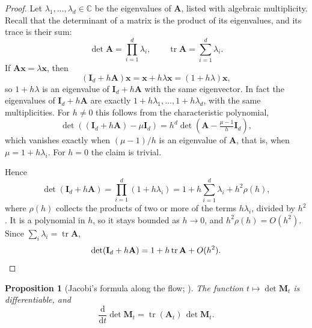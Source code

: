 \documentclass[11pt,a4paper]{article}
\numberwithin{equation}{section}     %
\theoremstyle{plain}        %
\newtheorem{proposition}[theorem]{Proposition}
\theoremstyle{definition}   %
\theoremstyle{remark}       %
\begin{document}
\begin{proof}
Let $\lambda_1,\dots,\lambda_d\in\mathbb{C}$ be the eigenvalues of $\mathbf{A}$, listed with algebraic multiplicity. Recall that the determinant of a matrix is the product of its eigenvalues, and its trace is their sum:
\[
\det\mathbf{A}=\prod_{i=1}^d\lambda_i,\qquad\operatorname{tr}\mathbf{A}=\sum_{i=1}^d\lambda_i .
\]
If $\mathbf{A}\mathbf{x}=\lambda\mathbf{x}$, then
\[
(\mathbf{I}_d+h\mathbf{A})\mathbf{x}=\mathbf{x}+h\lambda\mathbf{x}=(1+h\lambda)\mathbf{x},
\]
so $1+h\lambda$ is an eigenvalue of $\mathbf{I}_d+h\mathbf{A}$ with the same eigenvector. In fact the eigenvalues of $\mathbf{I}_d+h\mathbf{A}$ are exactly $1+h\lambda_1,\dots,1+h\lambda_d$, with the same multiplicities. For $h\neq0$ this follows from the characteristic polynomial,
\[
\det\left((\mathbf{I}_d+h\mathbf{A})-\mu\mathbf{I}_d\right)=h^d\det\left(\mathbf{A}-\tfrac{\mu-1}{h}\mathbf{I}_d\right),
\]
which vanishes exactly when $(\mu-1)/h$ is an eigenvalue of $\mathbf{A}$, that is, when $\mu=1+h\lambda_i$. For $h=0$ the claim is trivial.

Hence
\[
\det(\mathbf{I}_d+h\mathbf{A})=\prod_{i=1}^d(1+h\lambda_i)=1+h\sum_{i=1}^d\lambda_i+h^2\rho(h),
\]
where $\rho(h)$ collects the products of two or more of the terms $h\lambda_i$, divided by $h^2$. It is a polynomial in $h$, so it stays bounded as $h\to0$, and $h^2\rho(h)=O(h^2)$. Since $\sum_i\lambda_i=\operatorname{tr}\mathbf{A}$,
\[
\det(\mathbf{I}_d+h\mathbf{A})=1+h\operatorname{tr}\mathbf{A}+O(h^2). \qedhere
\]
\end{proof}

\begin{proposition}[Jacobi's formula along the flow; \citealp{magnus2019}]\label{prop:jacobiflow}
The function $t\mapsto\det\mathbf{M}_t$ is differentiable, and
\[
\frac{\mathrm{d}}{\mathrm{d}t}\det\mathbf{M}_t=\operatorname{tr}(\mathbf{A}_t)\,\det\mathbf{M}_t .
\]
\end{proposition}
\end{document}
